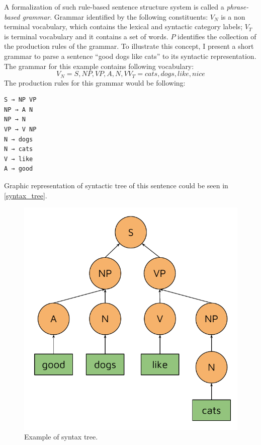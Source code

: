 A formalization of such rule-based sentence structure system is called a \emph{phrase-based grammar}. Grammar identified by the following constituents:
$V_N$ is a non terminal vocabulary, which contains the lexical and syntactic category labels;
$V_T$ is terminal vocabulary and it contains a set of words.
$P$ identifies the collection of the production rules of the grammar.
To illustrate this concept, I present a short grammar to parse a sentence "`good dogs like cats"' to its syntactic representation. The grammar for this example contains following vocabulary:
\begin{equation}
V_N = {S, NP, VP, A, N, V}
V_T = {cats, dogs, like, nice}
\end{equation}
The production rules for this grammar would be following:
\begin{verbatim}
S → NP VP
NP → A N
NP → N
VP → V NP
N → dogs
N → cats
V → like
A → good
\end{verbatim}
Graphic representation of syntactic tree  of this sentence could be seen in \ref{syntax_tree}.

\begin{figure}
\centering
\includegraphics{Figures/syntaxtree}
\decoRule
\caption[Syntax tree]{Example of syntax tree.}
\label{fig:syntax_tree}
\end{figure}

